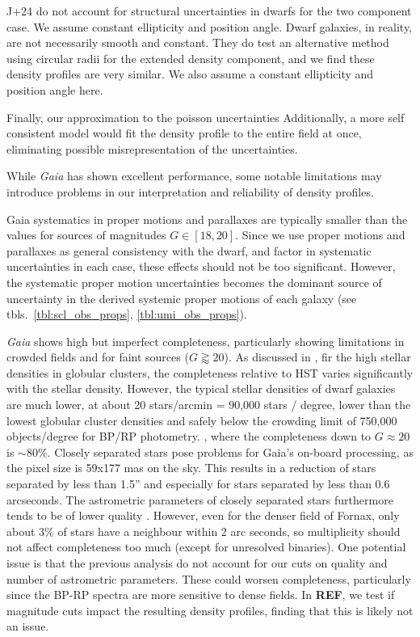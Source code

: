 J+24 do not account for structural uncertainties in dwarfs for the two
component case. We assume constant ellipticity and position angle. Dwarf
galaxies, in reality, are not necessarily smooth and constant. They do
test an alternative method using circular radii for the extended density
component, and we find these density profiles are very similar. We also
assume a constant ellipticity and position angle here.

Finally, our approximation to the poisson uncertainties Additionally, a
more self consistent model would fit the density profile to the entire
field at once, eliminating possible misrepresentation of the
uncertainties.

While \emph{Gaia} has shown excellent performance, some notable
limitations may introduce problems in our interpretation and reliability
of density profiles.

Gaia systematics in proper motions and parallaxes are typically smaller
than the values for sources of magnitudes \(G\in[18,20]\). Since we use
proper motions and parallaxes as general consistency with the dwarf, and
factor in systematic uncertainties in each case, these effects should
not be too significant. However, the systematic proper motion
uncertainties becomes the dominant source of uncertainty in the derived
systemic proper motions of each galaxy (see
tbls.~\ref{tbl:scl_obs_props}, \ref{tbl:umi_obs_props}).

\emph{Gaia} shows high but imperfect completeness, particularly showing
limitations in crowded fields and for faint sources (\(G\gtrapprox20\)).
As discussed in \citet{fabricius+2021}, fir the high stellar densities
in globular clusters, the completeness relative to HST varies
significantly with the stellar density. However, the typical stellar
densities of dwarf galaxies are much lower, at about 20 stars/arcmin =
90,000 stars / degree, lower than the lowest globular cluster densities
and safely below the crowding limit of 750,000 objects/degree for BP/RP
photometry. , where the completeness down to \(G\approx 20\) is
\(\sim 80\%\). Closely separated stars pose problems for Gaia's on-board
processing, as the pixel size is 59x177 mas on the sky. This results in
a reduction of stars separated by less than 1.5'' and especially for
stars separated by less than 0.6 arcseconds. The astrometric parameters
of closely separated stars furthermore tends to be of lower quality
\citep{fabricius+2021}. However, even for the denser field of Fornax,
only about 3\% of stars have a neighbour within 2 arc seconds, so
multiplicity should not affect completeness too much (except for
unresolved binaries). One potential issue is that the previous analysis
do not account for our cuts on quality and number of astrometric
parameters. These could worsen completeness, particularly since the
BP-RP spectra are more sensitive to dense fields. In \textbf{REF}, we
test if magnitude cuts impact the resulting density profiles, finding
that this is likely not an issue.

